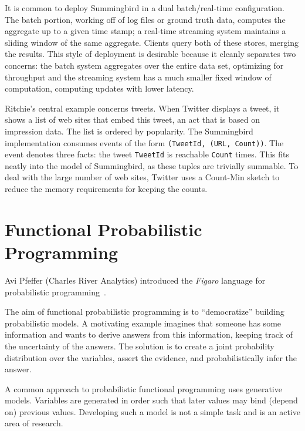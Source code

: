 \documentclass{jfp1}
\begin{document}
It is common to deploy Summingbird in a dual batch/real-time
configuration. The batch portion, working off of log files or ground truth
data, computes the aggregate up to a given time stamp; a real-time
streaming system maintains a sliding window of the same aggregate.
Clients query both of these stores, merging the results.  This style of
deployment is desirable because it cleanly separates two concerns: the
batch system aggregates over the entire data set, optimizing for
throughput and the streaming system has a much smaller fixed window of
computation, computing updates with lower latency.

Ritchie's central example concerns tweets. When Twitter displays a tweet,
it shows a list of web sites that embed this tweet, an act that is based
on impression data. The list is ordered by popularity.  The Summingbird
implementation consumes events of the form \texttt{(TweetId, (URL,
Count))}. The event denotes three facts: the tweet \texttt{TweetId} is
reachable \texttt{Count} times. This fits neatly into the model of
Summingbird, as these tuples are trivially summable. To deal with the
large number of web sites, Twitter uses a Count-Min sketch to reduce
the memory requirements for keeping the counts.

\section{Functional Probabilistic Programming}


Avi Pfeffer (Charles River Analytics) introduced the \textit{Figaro} language
for probabilistic programming~\cite{Pfeffer:2009:Figaro}. 

The aim of functional probabilistic programming is to ``democratize''
building probabilistic models. A motivating example imagines that someone
has some information and wants to derive answers from this information,
keeping track of the uncertainty of the answers. The solution is to create
a joint probability distribution over the variables, assert the evidence,
and probabilistically infer the answer.

A common approach to probabilistic functional programming uses generative
models. Variables are generated in order such that later values may bind
(depend on) previous values. Developing such a model is not a simple task
and is an active area of research.
\end{document}
